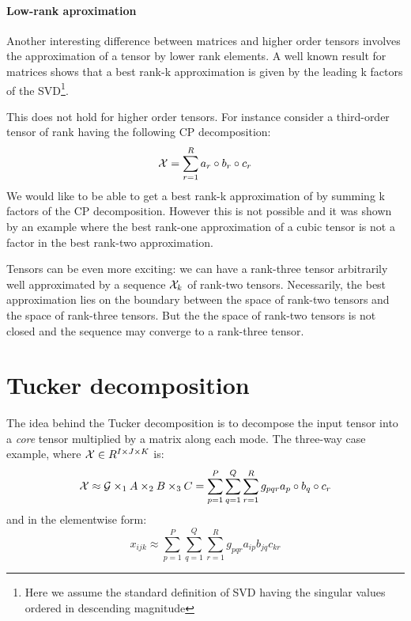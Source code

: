 \paragraph{Low-rank aproximation}
Another interesting difference between matrices and higher order tensors involves the approximation of a tensor by lower rank elements.
A well known result for matrices \cite{SVDbestapprox} shows that a best rank-k approximation is given by the leading k factors of the SVD\footnote{Here we assume the standard definition of SVD having the singular values ordered in descending magnitude}.

This does not hold for higher order tensors. For instance consider a third-order tensor of rank \R having the following CP decomposition:
\begin{equation*}
  \mathcal{X} = \sum_{r=1}^R a_r \circ b_r \circ c_r
\end{equation*}
We would like to be able to get a best rank-k approximation of \X by summing k factors of the CP decomposition. However this is not possible and it was shown by an example \cite{kolda2001orthogonal} where the best rank-one approximation of a cubic tensor is not a factor in the best rank-two approximation.

Tensors can be even more exciting: we can have a rank-three tensor \X arbitrarily well approximated by a sequence ${\mathcal{X}_k}$ of rank-two tensors. Necessarily, the best approximation lies on the boundary between the space of rank-two tensors and the space of rank-three tensors. But the the space of rank-two tensors is not closed and the sequence may converge to a rank-three tensor.  

\section{Tucker decomposition}
The idea behind the Tucker decomposition is to decompose the input tensor into a \emph{core} tensor multiplied by a matrix along each mode.
The three-way case example, where $\mathcal{X} \in R^{I \times J \times K}$ is:
\begin{equation*}
  \mathcal{X} \approx \mathcal{G} \times_1 A \times_2 B \times_3 C = \sum_{p=1}^P \sum_{q=1}^Q \sum_{r=1}^R g_{pqr} a_p \circ b_q \circ c_r
\end{equation*}
and in the elementwise form:
\begin{equation*}
  x_{ijk} \approx \sum_{p=1}^P \sum_{q=1}^Q \sum_{r=1}^R g_{pqr} a_{ip} b_{jq} c_{kr}
\end{equation*}

